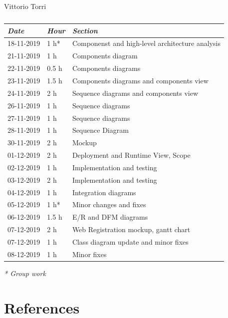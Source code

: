 \documentclass[a4paper]{report}
\begin{document}
\begin{table}[H]
\centering
Vittorio Torri \\
\begin{tabular}{p{2cm}p{1.5cm}p{7cm}}
\toprule
\textit{Date} & \textit{Hour} & \textit{Section} \\ \midrule
18-11-2019 & 1 h* & Componenst and high-level architecture analysis \\ \midrule
21-11-2019 & 1 h  & Components diagram \\ \midrule
22-11-2019 & 0.5 h & Components diagrams \\ \midrule
23-11-2019 & 1.5 h & Components diagrams and components view\\ \midrule
24-11-2019 & 2 h & Sequence diagrams and components view \\ \midrule
26-11-2019 & 1 h & Sequence diagrams \\ \midrule
27-11-2019 & 1 h & Sequence diagrams \\ \midrule
28-11-2019 & 1 h & Sequence Diagram \\ \midrule
30-11-2019 & 2 h & Mockup \\ \midrule
01-12-2019 & 2 h & Deployment and Runtime View, Scope \\ \midrule
02-12-2019 & 1 h & Implementation and testing \\ \midrule
03-12-2019 & 2 h & Implementation and testing \\ \midrule
04-12-2019 & 1 h & Integration diagrams \\ \midrule
05-12-2019 & 1 h* & Minor changes and fixes \\ \midrule
06-12-2019 & 1.5 h & E/R and DFM diagrams \\ \midrule
07-12-2019 & 2 h & Web Registration mockup, gantt chart \\ \midrule
07-12-2019 & 1 h & Class diagram update and minor fixes \\ \midrule
08-12-2019 & 1 h & Minor fixes \\
\bottomrule
\end{tabular}
\caption[Vittorio Torri's effort table]{}
\end{table}
\textit{* Group work}

\chapter{References}
\end{document}
